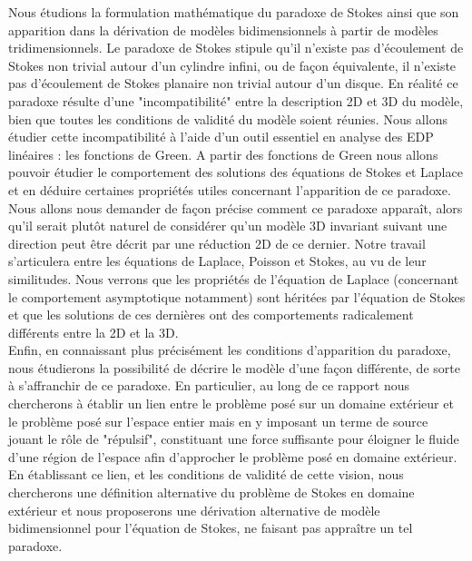 Nous étudions la formulation mathématique du paradoxe de Stokes ainsi que son apparition dans la dérivation de modèles bidimensionnels à partir de modèles tridimensionnels.
Le paradoxe de Stokes stipule qu'il n'existe pas d'écoulement de Stokes non trivial autour d'un cylindre infini, ou de façon équivalente, il n'existe pas d'écoulement de Stokes planaire non trivial autour d'un disque.
En réalité ce paradoxe résulte d'une "incompatibilité" entre la description 2D et 3D du modèle, bien que toutes les conditions de validité du modèle soient réunies.
Nous allons étudier cette incompatibilité à l'aide d'un outil essentiel en analyse des EDP linéaires : les fonctions de Green. A partir des fonctions de Green nous allons pouvoir étudier le comportement des solutions 
des équations de Stokes et Laplace et en déduire certaines propriétés utiles concernant l'apparition de ce paradoxe. Nous allons nous demander de façon précise comment ce paradoxe apparaît, alors qu'il serait plutôt naturel de considérer
qu'un modèle 3D invariant suivant une direction peut être décrit par une réduction 2D de ce dernier. Notre travail s'articulera entre les équations de Laplace, Poisson et Stokes, au vu de leur similitudes. Nous verrons que les propriétés
de l'équation de Laplace (concernant le comportement asymptotique notamment) sont héritées par l'équation de Stokes et que les solutions de ces dernières ont des comportements radicalement différents entre la 2D et la 3D.\\
Enfin, en connaissant plus précisément les conditions d'apparition du paradoxe, nous étudierons la possibilité de décrire le modèle d'une façon différente, de sorte à s'affranchir de ce paradoxe.
En particulier, au long de ce rapport nous chercherons à établir un lien entre le problème posé sur un domaine extérieur et le problème posé sur l'espace entier mais en y imposant
un terme de source jouant le rôle de "répulsif", constituant une force suffisante pour éloigner le fluide d'une région de l'espace afin d'approcher le problème posé en domaine extérieur.
En établissant ce lien, et les conditions de validité de cette vision, nous chercherons une définition alternative du problème de Stokes en domaine extérieur et nous proposerons une dérivation alternative 
de modèle bidimensionnel pour l'équation de Stokes, ne faisant pas appraître un tel paradoxe.

